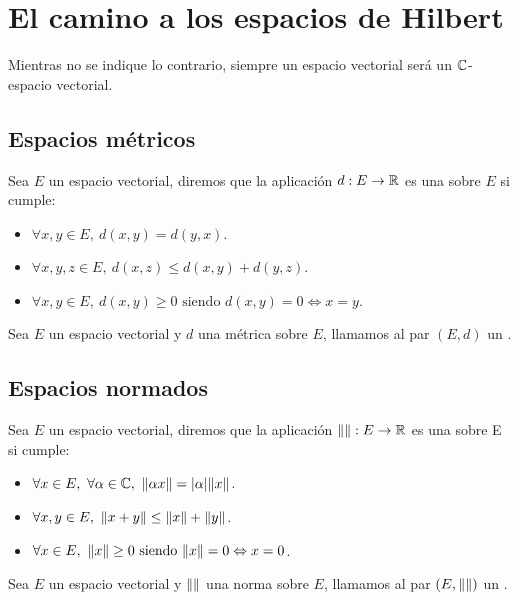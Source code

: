 \section{El camino a los espacios de Hilbert}
Mientras no se indique lo contrario, siempre un espacio vectorial será un $\mathbb{C}$-espacio vectorial.

\subsection{Espacios métricos}
\begin{definicion}
  \label{distancia}
  Sea $E$ un espacio vectorial, diremos que la aplicación $d:E \rightarrow \mathbb{R}$ es una  sobre $E$ si cumple:
  \begin{itemize}
    \item $\forall x,y \in E,\ d(x,y)=d(y,x)$.
    \item $\forall x,y,z \in E,\ d(x,z)\leq d(x, y)+d(y, z)$.
    \item $\forall x, y \in E,\ d(x,y)\geq 0 \text{ siendo } d(x,y)=0\Leftrightarrow x = y$.
  \end{itemize}
\end{definicion}

\begin{definicion}
  \label{espacio_metrico}
  Sea $E$ un espacio vectorial y $d$ una métrica sobre $E$, llamamos al par $(E, d)$ un .
\end{definicion}

\subsection{Espacios normados}
\begin{definicion}
  \label{norma}
  Sea $E$ un espacio vectorial, diremos que la aplicación $\lVert\rVert:E \rightarrow \mathbb{R}$ es una  sobre E si cumple:
  \begin{itemize}
    \item $\forall x \in E,\ \forall\alpha\in\C,\ \nor{\alpha x}=\abs{\alpha}\nor{x}$.
    \item $\forall x,y \in E,\ \nor{x+y}\leq\nor{x}+\nor{y}$.
    \item $\forall x \in E,\ \lVert x\rVert\geq 0 \text{ siendo } \lVert x\rVert=0\Leftrightarrow x = 0$.
  \end{itemize}
\end{definicion}

\begin{definicion}
  \label{espacio_normado}
  Sea $E$ un espacio vectorial y $\lVert\rVert$ una norma sobre $E$, llamamos al par $(E, \lVert\rVert)$ un .
\end{definicion}

